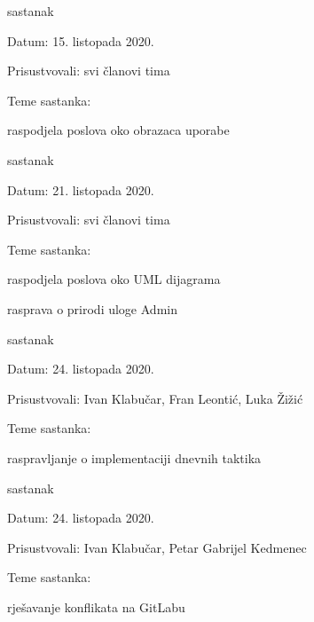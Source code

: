 \begin{packed_enum}
			\item  sastanak
			\item[] \begin{packed_item}
				\item Datum: 15. listopada 2020. 
				\item Prisustvovali: svi članovi tima
				\item Teme sastanka:
				\begin{packed_item}
					\item  raspodjela poslova oko obrazaca uporabe
				\end{packed_item}
			\end{packed_item}
			
			\item  sastanak
			\item[] \begin{packed_item}
				\item Datum: 21. listopada 2020. 
				\item Prisustvovali: svi članovi tima
				\item Teme sastanka:
				\begin{packed_item}
					\item  raspodjela poslova oko UML dijagrama
					\item  rasprava o prirodi uloge Admin
				\end{packed_item}
			\end{packed_item}
		
			\item  sastanak
			\item[] \begin{packed_item}
				\item Datum: 24. listopada 2020. 
				\item Prisustvovali: Ivan Klabučar, Fran Leontić, Luka Žižić
				\item Teme sastanka:
				\begin{packed_item}
					\item  raspravljanje o implementaciji dnevnih taktika
				\end{packed_item}
			\end{packed_item}
			
			\item  sastanak
			\item[] \begin{packed_item}
				\item Datum: 24. listopada 2020. 
				\item Prisustvovali: Ivan Klabučar, Petar Gabrijel Kedmenec
				\item Teme sastanka:
				\begin{packed_item}
					\item  rješavanje konflikata na GitLabu
				\end{packed_item}
			\end{packed_item}
		

\end{packed_enum}

